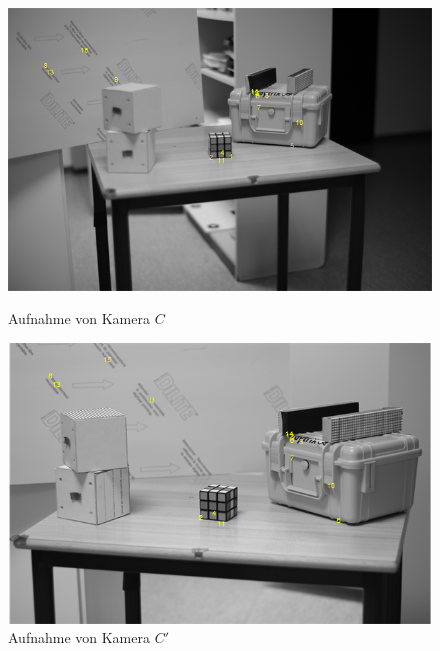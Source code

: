 \begin{figure}[!htb]
	\includegraphics[width=\linewidth]{images/PointsDetectedLeft.png}
	\caption[Aufnahme von Kamera $C$]{Aufnahme von Kamera $C$}
	\label{fig:SurfRechts}
	\endminipage\hfill
	\includegraphics[width=\linewidth]{images/PointsDetectedRight.png}
	\caption[Aufnahme von Kamera $C'$]{Aufnahme von Kamera $C'$}
	\label{fig:SurfLinks}
	\endminipage\hfill
\end{figure}

